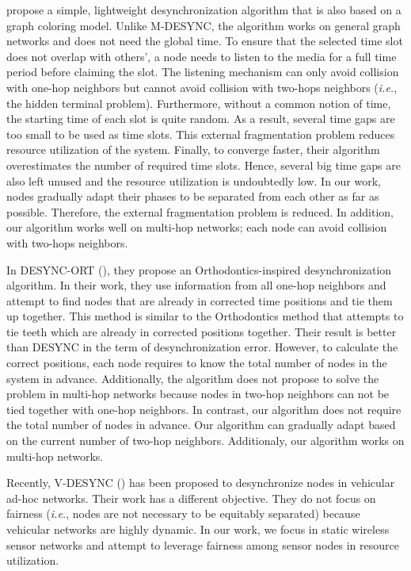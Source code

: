 \cite{5062165} propose a simple, lightweight desynchronization algorithm that is also based on a graph coloring model. Unlike M-DESYNC, the algorithm works on general graph networks and does not need the global time. To ensure that the selected time slot does not overlap with others', a node needs to listen to the media for a full time period before claiming the slot. The listening mechanism can only avoid collision with one-hop neighbors but cannot avoid collision with two-hops neighbors (\textit{i.e.}, the hidden terminal problem).
Furthermore, without a common notion of time, the starting time of each slot is quite random. As a result, several time gaps are too small to be used as time slots. This external fragmentation problem reduces resource utilization of the system. Finally, to converge faster, their algorithm overestimates the number of required time slots. Hence, several big time gaps are also left unused and the resource utilization is undoubtedly low. In our work, nodes gradually adapt their phases to be separated from each other as far as possible. Therefore, the external fragmentation problem is reduced. In addition, our algorithm works well on multi-hop networks; each node can avoid collision with two-hops neighbors.

In DESYNC-ORT (\cite{desyncort}), they propose an Orthodontics-inspired desynchronization
algorithm.
In their work, they use information from all one-hop neighbors and attempt to find nodes that are already in corrected time positions and tie them up together.
This method is similar to the Orthodontics method that attempts to tie teeth which are already in corrected positions together.
Their result is better than DESYNC in the term of desynchronization error. 
However, to calculate the correct positions, each node requires to know the total number of nodes in the system in advance. Additionally, the algorithm does not propose to solve the problem in multi-hop networks because nodes in two-hop neighbors can not be tied together with one-hop neighbors. In contrast, our algorithm does not require the total number of nodes in advance. Our algorithm can gradually adapt based on the current number of two-hop neighbors. Additionaly, our algorithm works on multi-hop networks. 

Recently, V-DESYNC (\cite{v-desync}) has been proposed to desynchronize nodes in vehicular ad-hoc networks. Their work has a different objective. They do not focus on fairness (\textit{i.e.}, nodes are not necessary to be equitably separated) because vehicular networks are highly dynamic. In our work, we focus in static wireless sensor networks and attempt to leverage fairness among sensor nodes in resource utilization.

